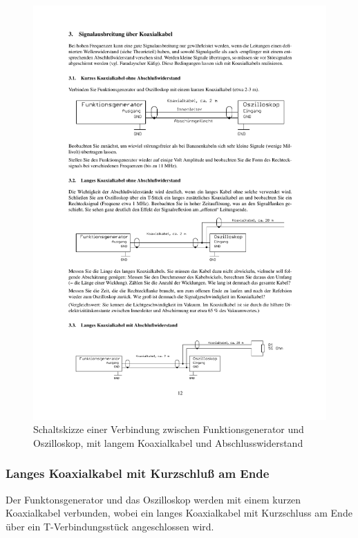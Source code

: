 \documentclass[12pt,a4paper]{article}
\begin{document}
\begin{figure}[H] 
  \centering
    \includegraphics[trim = 10mm 25mm 10mm 235mm, clip, scale = 1]{3-3_3.pdf}
  	\caption[Schaltskizze einer Verbindung zwischen Funktionsgenerator und Oszilloskop, mit langem Koaxialkabel und Abschlusswiderstand]{Schaltskizze einer Verbindung zwischen Funktionsgenerator und Oszilloskop, mit langem Koaxialkabel und Abschlusswiderstand\footnotemark}
  \label{fig:3.3}
\end{figure}

\subsubsection{Langes Koaxialkabel mit Kurzschluß am Ende}

Der Funktonsgenerator und das Oszilloskop werden mit einem kurzen Koaxialkabel verbunden, wobei ein langes Koaxialkabel mit Kurzschluss am Ende über ein T-Verbindungsstück angeschlossen wird.
\end{document}
